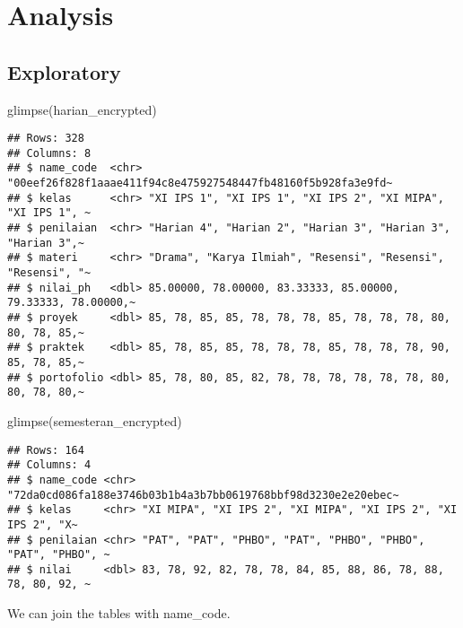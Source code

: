 \documentclass[
]{article}
\newenvironment{Shaded}{\begin{snugshade}}{\end{snugshade}}
\newcommand{\FunctionTok}[1]{\textcolor[rgb]{0.00,0.00,0.00}{#1}}
\newcommand{\NormalTok}[1]{#1}
\begin{document}
\hypertarget{analysis}{%
\section{Analysis}\label{analysis}}

\hypertarget{exploratory}{%
\subsection{Exploratory}\label{exploratory}}

\begin{Shaded}
\begin{Highlighting}[]
\FunctionTok{glimpse}\NormalTok{(harian\_encrypted)}
\end{Highlighting}
\end{Shaded}

\begin{verbatim}
## Rows: 328
## Columns: 8
## $ name_code  <chr> "00eef26f828f1aaae411f94c8e475927548447fb48160f5b928fa3e9fd~
## $ kelas      <chr> "XI IPS 1", "XI IPS 1", "XI IPS 2", "XI MIPA", "XI IPS 1", ~
## $ penilaian  <chr> "Harian 4", "Harian 2", "Harian 3", "Harian 3", "Harian 3",~
## $ materi     <chr> "Drama", "Karya Ilmiah", "Resensi", "Resensi", "Resensi", "~
## $ nilai_ph   <dbl> 85.00000, 78.00000, 83.33333, 85.00000, 79.33333, 78.00000,~
## $ proyek     <dbl> 85, 78, 85, 85, 78, 78, 78, 85, 78, 78, 78, 80, 80, 78, 85,~
## $ praktek    <dbl> 85, 78, 85, 85, 78, 78, 78, 85, 78, 78, 78, 90, 85, 78, 85,~
## $ portofolio <dbl> 85, 78, 80, 85, 82, 78, 78, 78, 78, 78, 78, 80, 80, 78, 80,~
\end{verbatim}

\begin{Shaded}
\begin{Highlighting}[]
\FunctionTok{glimpse}\NormalTok{(semesteran\_encrypted)}
\end{Highlighting}
\end{Shaded}

\begin{verbatim}
## Rows: 164
## Columns: 4
## $ name_code <chr> "72da0cd086fa188e3746b03b1b4a3b7bb0619768bbf98d3230e2e20ebec~
## $ kelas     <chr> "XI MIPA", "XI IPS 2", "XI MIPA", "XI IPS 2", "XI IPS 2", "X~
## $ penilaian <chr> "PAT", "PAT", "PHBO", "PAT", "PHBO", "PHBO", "PAT", "PHBO", ~
## $ nilai     <dbl> 83, 78, 92, 82, 78, 78, 84, 85, 88, 86, 78, 88, 78, 80, 92, ~
\end{verbatim}

We can join the tables with name\_code.
\end{document}
